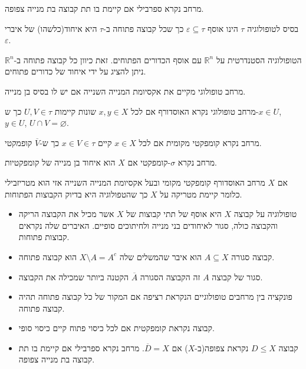 \documentclass{tstextbook}
\begin{document}
\begin{definition}[ספרבילי]
מרחב נקרא ספרבילי אם קיימת בו תת קבוצה בת מנייה צפופה.

\end{definition}
\begin{definition}
בסיס לטופולוגיה \(\tau\) הינו אוסף \(\varepsilon \subseteq \tau\) כך שכל קבוצה פתוחה ב-\(\tau\) היא איחוד(כלשהו) של איברי \(\varepsilon\).

\end{definition}
\begin{example}
הטופולוגיה הסטנדרטית על \(\mathbb{R}^{n}\) עם אוסף הכדורים הפתוחים. זאת כיוון כל קבוצה פתוחה ב-\(\mathbb{R}^{n}\) ניתן להציג על ידי איחוד של כדורים פתוחים.

\end{example}
\begin{definition}
מרחב טופולוגי מקיים את אקסיומת המנייה השנייה אם יש לו בסיס בן מנייה.

\end{definition}
\begin{definition}
מרחב טופולוגי נקרא האוסדורף אם לכל \(x,y \in X\) שונות קיימות \(U,V \in \tau\) כך ש-\(x \in U\), \(y \in U\), \(U\cap V = \varnothing\).

\end{definition}
\begin{definition}
מרחב נקרא קומפקטי מקומית אם לכל \(x \in X\) קיים \(x \in V \in \tau\) כך ש-\(\overline{V}\) קופמקטי. 

\end{definition}
\begin{definition}
מרחב נקרא \(\sigma\)-קומפקטי אם \(X\) הוא איחוד בן מנייה של קומפקטיות.

\end{definition}
\begin{theorem}
אם \(X\) מרחב האוסדורף קומפקטי מקומי ובעל אקסיומת המנייה השנייה אזי הוא מטריזבילי כלומר קיימת מטריקה על \(X\) כך שהטפולוגיה היא בדיוק הקבוצות הפתוחות.

\end{theorem}
\begin{summary}
  \begin{itemize}
    \item טופולוגיה על קבוצה \(X\) היא אוסף של תתי קבוצות של \(X\) אשר מכיל את הקבוצה הריקה והקבוצה כולה, סגור לאיחודים בני מנייה ולחיתוכים סופיים. האיברים שלה נקראים קבוצות פתוחות.
    \item קבוצה סגורה \(A\subseteq X\) הוא איבר שהמשלים שלה \(X\setminus A = A^{c}\) הוא קבוצה פתוחה.
    \item סגור של קבוצה \(A\) זה הקבוצה הסגורה \(\overline{A}\) הקטנה ביותר שמכילה את הקבוצה.
    \item פונקציה בין מרחבים טופולוגיים הנקראת רציפה אם המקור של כל קבוצה פתוחה תהיה קבוצה פתוחה.
    \item קבוצה נקראת קומפקטית אם לכל כיסוי פתוח קיים כיסוי סופי.
    \item קבוצה \(D\leq X\) נקראת צפופה(ב-\(X\)) אם \(\overline{D}=X\). מרחב נקרא ספרבילי אם קיימת בו תת קבוצה בת מנייה צפופה.
  \end{itemize}
\end{summary}
\end{document}
